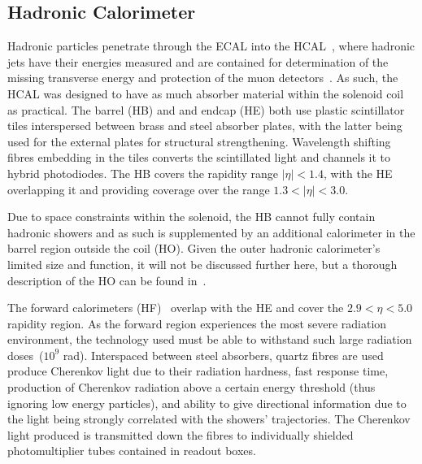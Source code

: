 
\subsection{Hadronic Calorimeter}\label{subsec:HCAL}
Hadronic particles penetrate through the ECAL into the HCAL~\cite{CMS:1997xji}, where hadronic jets have their energies measured and are contained for determination of the missing transverse energy and protection of the muon detectors~\cite{HCAL:tdr}.
As such, the HCAL was designed to have as much absorber material within the solenoid coil as practical. 
The barrel (HB) and and endcap (HE) both use plastic scintillator tiles interspersed between brass and steel absorber plates, with the latter being used for the external plates for structural strengthening.
Wavelength shifting fibres embedding in the tiles converts the scintillated light and channels it to hybrid photodiodes.
The HB covers the rapidity range $|\eta| < 1.4$, with the HE overlapping it and providing coverage over the range $1.3 < |\eta| < 3.0$.

Due to space constraints within the solenoid, the HB cannot fully contain hadronic showers and as such is supplemented by an additional calorimeter in the barrel region outside the coil (HO). Given the outer hadronic calorimeter's limited size and function, it will not be discussed further here, but a thorough description of the HO can be found in~\cite{HO}.

The forward calorimeters (HF)~\cite{HF} overlap with the HE and cover the $2.9 < \eta < 5.0$ rapidity region.
As the forward region experiences the most severe radiation environment, the technology used must be able to withstand such large radiation doses~($10^{9}$ rad). 
Interspaced between steel absorbers, quartz fibres are used produce Cherenkov light due to their radiation hardness, fast response time, production of Cherenkov radiation above a certain energy threshold (thus ignoring low energy particles), and ability to give directional information due to the light being strongly correlated with the showers' trajectories.
The Cherenkov light produced is transmitted down the fibres to individually shielded photomultiplier tubes contained in readout boxes.


